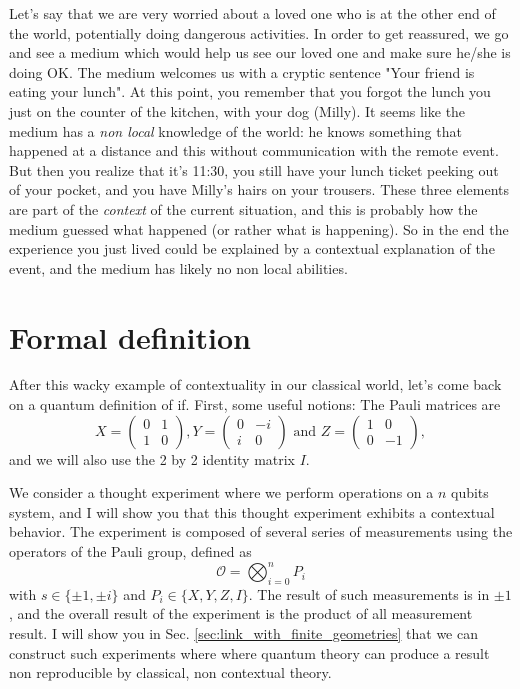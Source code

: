 \documentclass{article}
\begin{document}
Let's say that we are very worried about a loved one who is at the other end of
the world, potentially doing dangerous activities. In order to get reassured, we
go and see a medium which would help us see our loved one and make sure he/she
is doing OK. The medium welcomes us with a cryptic sentence "Your friend is
eating your lunch". At this point, you remember that you forgot the lunch you
just on the counter of the kitchen, with your dog (Milly). It seems like the
medium has a \emph{non local} knowledge of the world: he knows something that
happened at a distance and this without communication with the remote event. But
then you realize that it's 11:30, you still have your lunch ticket peeking out
of your pocket, and you have Milly's hairs on your trousers. These three
elements are part of the \emph{context} of the current situation, and this is
probably how the medium guessed what happened (or rather what is happening). So
in the end the experience you just lived could be explained by a contextual
explanation of the event, and the medium has likely no non local abilities.

\section{Formal definition}
\label{sec:formal_definition}

After this wacky example of contextuality in our classical world, let's come back
on a quantum definition of if. First, some useful notions: The Pauli matrices are
$$X=\begin{pmatrix}
  0 & 1\\
  1 & 0
\end{pmatrix},Y=\begin{pmatrix}
  0 &  -i\\
  i & 0
\end{pmatrix} \text{ and } Z=\begin{pmatrix}
  1 & 0\\
  0 &-1
\end{pmatrix},$$
and we will also use the 2 by 2 identity matrix $I$.

We consider a thought experiment where we perform operations on a $n$ qubits
system, and I will show you that this thought experiment exhibits a contextual
behavior. The experiment is composed of several series of measurements using the
operators of the Pauli group, defined as
$$\mathcal{O} = \bigotimes_{i=0}^n P_i$$
with $s\in\{\pm 1, \pm i\}$ and $P_i\in\{X,Y,Z,I\}$.
The result of such measurements is in $\pm 1$, and the overall result of the
experiment is the product of all measurement result. I will show you in Sec. 
\ref{sec:link_with_finite_geometries} that we can construct such experiments
where where quantum theory can produce a result non reproducible by classical,
non contextual theory.
\end{document}

